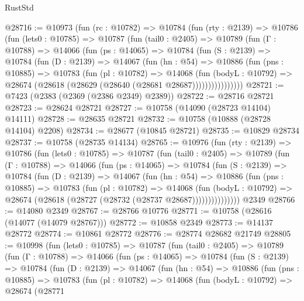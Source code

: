 \begin{lexlean}{RustStd}
\begin{coremodule}
@28716 := @10973
    (fun (rc : @10782) =>
    @10784
      (fun (rty : @2139) =>
      @10786
        (fun (lets0 : @10785) =>
        @10787
          (fun (tail0 : @2405) =>
          @10789
            (fun (Γ : @10788) =>
            @14066
              (fun (ps : @14065) =>
              @10784
                (fun (S : @2139) =>
                @10784
                  (fun (D : @2139) =>
                  @14067
                    (fun (hn : @54) =>
                    @10886
                      (fun (pns : @10885) =>
                      @10783
                        (fun (pl : @10782) =>
                        @14068
                          (fun (bodyL : @10792) =>
                          @28674 (@28618 (@28629 (@28640 (@28681 @28687))))))))))))))))
@28721 := @7423 (@2383 (@2369 (@2386 @2349) @2389))
@28722 := @28716 @28721
@28723 := @28624 @28721
@28727 := @10758 (@14090 (@28723 @14104) @14111)
@28728 := @28635 @28721
@28732 := @10758 (@10888 (@28728 @14104) @2208)
@28734 := @28677 (@10845 @28721)
@28735 := @10829 @28734
@28737 := @10758 (@28735 @14134)
@28765 := @10976
    (fun (rty : @2139) =>
    @10786
      (fun (lets0 : @10785) =>
      @10787
        (fun (tail0 : @2405) =>
        @10789
          (fun (Γ : @10788) =>
          @14066
            (fun (ps : @14065) =>
            @10784
              (fun (S : @2139) =>
              @10784
                (fun (D : @2139) =>
                @14067
                  (fun (hn : @54) =>
                  @10886
                    (fun (pns : @10885) =>
                    @10783
                      (fun (pl : @10782) =>
                      @14068
                        (fun (bodyL : @10792) =>
                        @28674 (@28618 (@28727 (@28732 (@28737 @28687)))))))))))))))
    @2349
@28766 := @14080 @2349
@28767 := @28766 @10776
@28771 := @10758 (@28616 (@14077 (@14079 @28767)))
@28772 := @10858 @2349
@28773 := @14137 @28772
@28774 := @10861 @28772
@28776 := @28774 @28682 @21749
@28805 := @10998
    (fun (lets0 : @10785) =>
    @10787
      (fun (tail0 : @2405) =>
      @10789
        (fun (Γ : @10788) =>
        @14066
          (fun (ps : @14065) =>
          @10784
            (fun (S : @2139) =>
            @10784
              (fun (D : @2139) =>
              @14067
                (fun (hn : @54) =>
                @10886
                  (fun (pns : @10885) =>
                  @10783
                    (fun (pl : @10782) =>
                    @14068
                      (fun (bodyL : @10792) =>
                      @28674
                        (@28771

\end{coremodule}
\end{lexlean}
